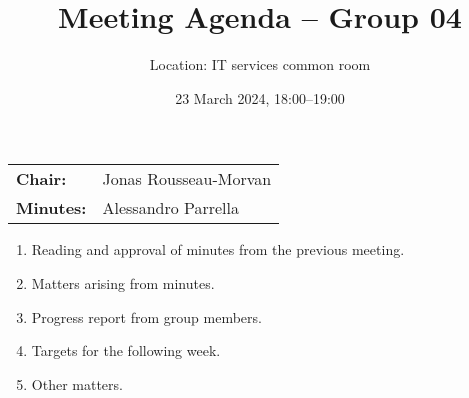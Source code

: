 \documentclass{cce2014-meetings}
\title{Meeting Agenda -- Group 04}
\author{Location: IT services common room}
\date{23 March 2024, 18:00--19:00}
\begin{document}
\maketitle
\begin{center}
        \begin{tabular}{ll}
                \textbf{Chair:}   & Jonas Rousseau-Morvan \\
                \textbf{Minutes:} & Alessandro Parrella
        \end{tabular}
\end{center}

\begin{enumerate}

        \item Reading and approval of minutes from the previous meeting.

        \item Matters arising from minutes.

        \item Progress report from group members.

        \item Targets for the following week.

        \item Other matters.

\end{enumerate}
\end{document}
